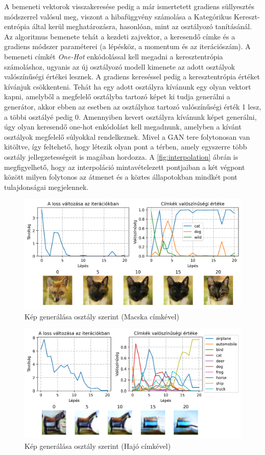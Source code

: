 A bemeneti vektorok visszakeresése pedig a már ismertetett gradiens süllyesztés módszerrel valósul meg, viszont a hibafüggvény számolása a Kategórikus Kereszt-entrópia által kerül meghatározásra, hasonlóan, mint az osztályozó tanításánál. Az algoritmus bemenete tehát a kezdeti zajvektor, a keresendő címke és a gradiens módszer paraméterei (a lépésköz, a momentum és az iterációszám).
A bemeneti címkét \textit{One-Hot} enkódolással kell megadni a keresztentrópia számoláshoz, ugyanis az új osztályozó modell kimenete az adott osztályok valószínűségi értékei lesznek. A gradiens kereséssel pedig a keresztentrópia értéket kívánjuk csökkenteni. Tehát ha egy adott osztályra kívánunk egy olyan vektort kapni, amelyből a megfelelő osztályba tartozó képet ki tudja generálni a generátor, akkor ebben az esetben az osztályhoz tartozó valószínűségi érték 1 lesz, a többi osztályé pedig 0.
Amennyiben kevert osztályra kívánunk képet generálni, úgy olyan keresendő one-hot enkódolást kell megadnunk, amelyben a kívánt osztályok megfelelő súlyokkal rendelkeznek. Mivel a GAN tere folytonosan van kitöltve, így feltehető, hogy létezik olyan pont a térben, amely egyszerre több osztály jellegzetességeit is magában hordozza. A \ref{fig:interpolation} ábrán is megfigyelhető, hogy az interpoláció mintavételezett pontjaiban a két végpont között milyen folytonos az átmenet és a köztes állapotokban mindkét pont tulajdonságai megjelennek.



\begin{figure}[h]
	\centering
	\includegraphics[width=15cm]{images/searching-cat.png}
	\caption{Kép generálása osztály szerint (Macska címkével)}
	\label{fig:searching}
\end{figure}

\begin{figure}[h]
	\centering
	\includegraphics[width=15cm]{images/searching-cifar_ship.png}
	\caption{Kép generálása osztály szerint (Hajó címkével)}
	\label{fig:searching_ship}
\end{figure}
